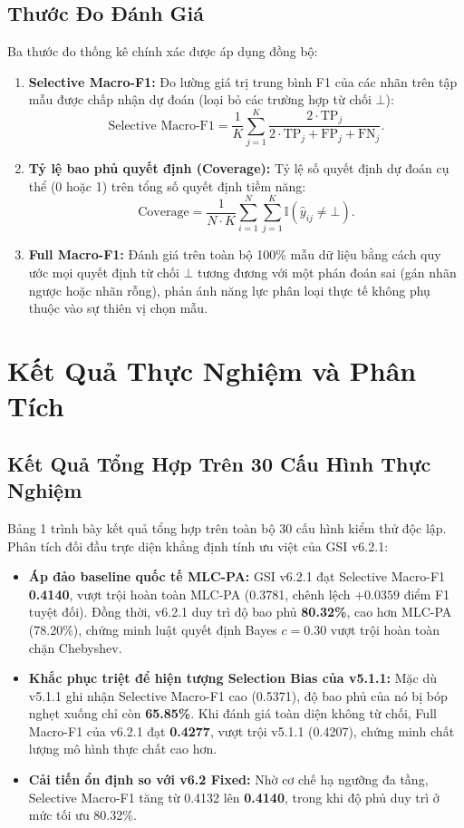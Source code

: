 \documentclass[10pt,a4paper,twoside]{article}
\begin{document}
\subsection{Thước Đo Đánh Giá}
Ba thước đo thống kê chính xác được áp dụng đồng bộ:
\begin{enumerate}[leftmargin=*]
    \item \textbf{Selective Macro-F1:} Đo lường giá trị trung bình F1 của các nhãn trên tập mẫu được chấp nhận dự đoán (loại bỏ các trường hợp từ chối $\bot$):
    \begin{equation}
    \text{Selective Macro-F1} = \frac{1}{K}\sum_{j=1}^K \frac{2 \cdot \text{TP}_j}{2 \cdot \text{TP}_j + \text{FP}_j + \text{FN}_j}.
    \end{equation}
    \item \textbf{Tỷ lệ bao phủ quyết định (Coverage):} Tỷ lệ số quyết định dự đoán cụ thể (0 hoặc 1) trên tổng số quyết định tiềm năng:
    \begin{equation}
    \text{Coverage} = \frac{1}{N \cdot K}\sum_{i=1}^N \sum_{j=1}^K \mathbb{I}(\hat{y}_{ij} \neq \bot).
    \end{equation}
    \item \textbf{Full Macro-F1:} Đánh giá trên toàn bộ 100\% mẫu dữ liệu bằng cách quy ước mọi quyết định từ chối $\bot$ tương đương với một phán đoán sai (gán nhãn ngược hoặc nhãn rỗng), phản ánh năng lực phân loại thực tế không phụ thuộc vào sự thiên vị chọn mẫu.
\end{enumerate}

\section{Kết Quả Thực Nghiệm và Phân Tích}

\subsection{Kết Quả Tổng Hợp Trên 30 Cấu Hình Thực Nghiệm}
Bảng 1 trình bày kết quả tổng hợp trên toàn bộ 30 cấu hình kiểm thử độc lập. Phân tích đối đầu trực diện khẳng định tính ưu việt của GSI v6.2.1:
\begin{itemize}[leftmargin=*]
    \item \textbf{Áp đảo baseline quốc tế MLC-PA:} GSI v6.2.1 đạt Selective Macro-F1 \textbf{0.4140}, vượt trội hoàn toàn MLC-PA (0.3781, chênh lệch $+0.0359$ điểm F1 tuyệt đối). Đồng thời, v6.2.1 duy trì độ bao phủ \textbf{80.32\%}, cao hơn MLC-PA (78.20\%), chứng minh luật quyết định Bayes $c = 0.30$ vượt trội hoàn toàn chặn Chebyshev.
    \item \textbf{Khắc phục triệt để hiện tượng Selection Bias của v5.1.1:} Mặc dù v5.1.1 ghi nhận Selective Macro-F1 cao (0.5371), độ bao phủ của nó bị bóp nghẹt xuống chỉ còn \textbf{65.85\%}. Khi đánh giá toàn diện không từ chối, Full Macro-F1 của v6.2.1 đạt \textbf{0.4277}, vượt trội v5.1.1 (0.4207), chứng minh chất lượng mô hình thực chất cao hơn.
    \item \textbf{Cải tiến ổn định so với v6.2 Fixed:} Nhờ cơ chế hạ ngưỡng đa tầng, Selective Macro-F1 tăng từ 0.4132 lên \textbf{0.4140}, trong khi độ phủ duy trì ở mức tối ưu 80.32\%.
\end{itemize}
\end{document}
